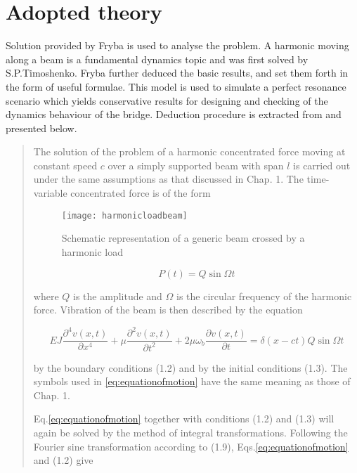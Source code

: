 \section{Adopted theory}

Solution provided by Fryba\cite{fryba1999vibration} is used to analyse the problem. A harmonic moving along a beam is a fundamental dynamics topic and was first solved by S.P.Timoshenko. Fryba further deduced the basic results, and set them forth in the form of useful formulae. This model is used to simulate a perfect resonance scenario which yields conservative results for designing and checking of the dynamics behaviour of the bridge. Deduction procedure is extracted from \cite[Section II.2.1]{fryba1999vibration} and presented below.

\begin{quote}

The solution of the problem of a harmonic concentrated force moving at constant speed $c$ over a simply supported beam with span $l$ is carried out under the same assumptions as that discussed in Chap. 1. The time-variable concentrated force is of the form

\begin{figure}[h]
    \centering
    \texttt{[image: harmonicloadbeam]}
    \caption{Schematic representation of a generic beam crossed by a harmonic load}
    \label{fig:harmonicloadbeam}
\end{figure}

\begin{equation}
    P(t) = Q \sin \Omega t
\end{equation}

where $Q$ is the amplitude and $\Omega$ is the circular frequency of the harmonic force. Vibration of the beam is then described by the equation

\begin{equation}\label{eq:equationofmotion}
    EJ\frac{\partial^4 v(x,t)}{\partial x^4} + \mu\frac{\partial^2 v(x,t)}{\partial t^2} +2\mu\omega_b \frac{\partial v(x,t)}{\partial t} = \delta(x-ct)Q\sin\Omega t 
\end{equation}

by the boundary conditions (1.2) and by the initial conditions (1.3). The symbols used in \ref{eq:equationofmotion} have the same meaning as those of Chap. 1.

Eq.\ref{eq:equationofmotion} together with conditions (1.2) and (1.3) will again be solved by the method of integral transformations. Following the Fourier sine transformation according to (1.9), Eqs.\ref{eq:equationofmotion} and (1.2) give


\end{quote}
